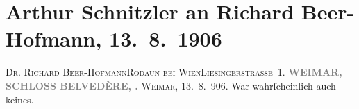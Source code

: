 

         
         \renewcommand{\erwaehntePersonen}{Personen: Richard Beer-Hofmann}
         \renewcommand{\erwaehnteOrte}{Orte: Belvedere, Liesingerstraße, Rodaun, Weimar}
         \renewcommand{\erwaehnteWerke}{}
               \section[Arthur Schnitzler an Richard Beer-Hofmann, 13. 8. 1906]{ Arthur Schnitzler an Richard Beer-Hofmann, 13. 8. 1906}\nopagebreak{}\rehead{ }\begin{ledgroupsized}[t]{13cm}\normalsize\beginnumbering \toendnotes[C]{\smallbreak\pagebreak[2]} 
\toendnotes[C]{\smallbreak}\pstart{}{\pb}\textsc{Dr. Richard Beer-Hofmann}\pend{}\pstart{}\textsc{Rodaun bei Wien}\pend{}\pstart{}\textsc{Liesingerstraße 1}.\pend{}{\bigskip}\pstart
           \noindent{}\centering{}{\pb}\textcolor{gray}{\textbf{WEIMAR, SCHLOSS BELVEDÈRE,{ }\label{K_L01623-1v}\label{K_L01623-1h}.}}\pend
           \pstart
           \raggedleft{}\textsc{Weimar}, 13. 8. 906.\pend
           \pstart
           War wahrſcheinlich auch keines.\pend
           
         
         \endnumbering{}\end{ledgroupsized}  \newcommand{\dateiname}{L01623}\newcommand{\titel}{Arthur Schnitzler an Richard Beer-Hofmann, 13. 8. 1906}\newcommand{\editorInnen}{Martin Anton Müller und Gerd-Hermann Susen}
      